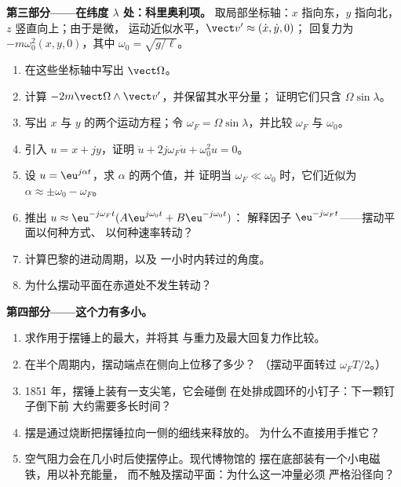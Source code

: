 \begin{problem}
\medskip
\noindent\textbf{第三部分——在纬度 $\lambda$ 处：科里奥利项。}
取局部坐标轴：$x$ 指向东，$y$ 指向北，$z$ 竖直向上；由于是微，
运动近似水平，$\vect v' \approx (\dot x, \dot y, 0)$；
回复力为 $-m\omega_0^2(x, y, 0)$，其中 $\omega_0 = \sqrt{g/\ell}$。
\begin{enumerate}[resume]
  \item 在这些坐标轴中写出 $\vect\Omega$。
  \item 计算 $-2m\vect\Omega\wedge\vect v'$，并保留其水平分量；
        证明它们只含 $\Omega\sin\lambda$。
  \item 写出 $x$ 与 $y$ 的两个运动方程；令
        $\omega_F = \Omega\sin\lambda$，并比较 $\omega_F$ 与 $\omega_0$。
  \item 引入 $u = x + jy$，证明 $\ddot u + 2j\omega_F\dot u +
        \omega_0^2u = 0$。
  \item 设 $u = \eu^{j\alpha t}$，求 $\alpha$ 的两个值，并
        证明当 $\omega_F \ll \omega_0$ 时，它们近似为 $\alpha \approx \pm\omega_0
        - \omega_F$。
  \item 推出 $u \approx \eu^{-j\omega_Ft}(A\eu^{j\omega_0t} + B\eu^{-j\omega_0t})$：
        解释因子 $\eu^{-j\omega_Ft}$——摆动平面以何种方式、
        以何种速率转动？
  \item 计算巴黎的进动周期，以及
        一小时内转过的角度。
  \item 为什么摆动平面在赤道处不发生转动？
\end{enumerate}

\medskip
\noindent\textbf{第四部分——这个力有多小。}
\begin{enumerate}[resume]
  \item 求作用于摆锤上的最大，并将其
        与重力及最大回复力作比较。
  \item 在半个周期内，摆动端点在侧向上位移了多少？
        （摆动平面转过 $\omega_FT/2$。）
  \item 1851 年，摆锤上装有一支尖笔，它会碰倒
        在处排成圆环的小钉子：下一颗钉子倒下前
        大约需要多长时间？
  \item 摆是通过烧断把摆锤拉向一侧的细线来释放的。
        为什么不直接用手推它？
  \item 空气阻力会在几小时后使摆停止。现代博物馆的
        摆在底部装有一个小电磁铁，用以补充能量，
        而不触及摆动平面：为什么这一冲量必须
        严格沿径向？
\end{enumerate}


\end{problem}
